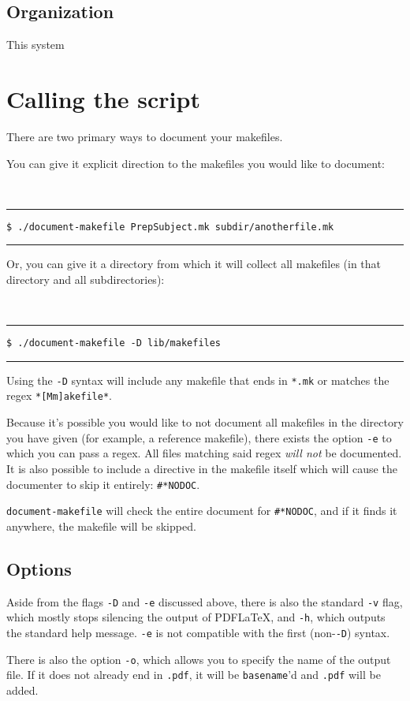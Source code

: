 \documentclass[oneside,11pt]{article}
\newcommand{\bashcmd}[1]{ \hfill\, \begin{minipage}[t]{\linewidth}  \hrule \vspace{0.5\baselineskip} \texttt{\small \$ #1} \vspace{0.5\baselineskip} \hrule \end{minipage} \vspace{0.5\baselineskip} }
\begin{document}
	\subsection{Organization}
	
	This system 
	
	\section{Calling the script}
	
	There are two primary ways to document your makefiles.
	
	You can give it explicit direction to the makefiles you would like to document:
	
	\bashcmd{./document-makefile PrepSubject.mk subdir/anotherfile.mk}
	
	Or, you can give it a directory from which it will collect all makefiles (in that directory and all subdirectories):
	
	\bashcmd{./document-makefile -D lib/makefiles}
	
	Using the \texttt{-D} syntax will include any makefile that ends in \texttt{*.mk} or matches the regex \texttt{*[Mm]akefile*}.
	
	Because it's possible you would like to not document all makefiles in the directory you have given (for example, a reference makefile), there exists the option \texttt{-e} to which you can pass a regex. All files matching said regex \textit{will not} be documented. It is also possible to include a directive in the makefile itself which will cause the documenter to skip it entirely: \texttt{\#*NODOC}.
	
	\texttt{document-makefile} will check the entire document for \texttt{\#*NODOC}, and if it finds it anywhere, the makefile will be skipped.
	
	\subsection{Options}
	
	Aside from the flags \texttt{-D} and \texttt{-e} discussed above, there is also the standard \texttt{-v} flag, which mostly stops silencing the output of PDF\LaTeX, and \texttt{-h}, which outputs the standard help message. \texttt{-e} is not compatible with the first (non-\texttt{-D}) syntax.
	
	There is also the option \texttt{-o}, which allows you to specify the name of the output file. If it does not already end in \texttt{.pdf}, it will be \texttt{basename}'d and \texttt{.pdf} will be added.
	
\end{document}

